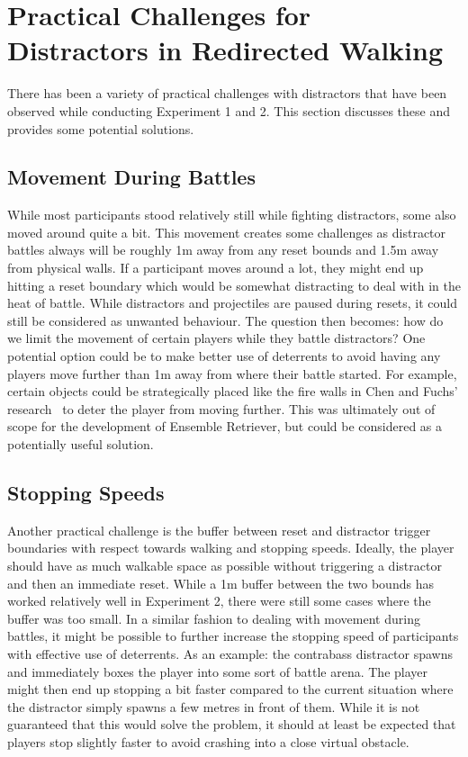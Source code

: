 \section{Practical Challenges for Distractors in Redirected Walking}
There has been a variety of practical challenges with distractors that have been observed while conducting Experiment 1 and 2. This section discusses these and provides some potential solutions. 

\subsection{Movement During Battles}
While most participants stood relatively still while fighting distractors, some also moved around quite a bit. This movement creates some challenges as distractor battles always will be roughly 1m away from any reset bounds and 1.5m away from physical walls. If a participant moves around a lot, they might end up hitting a reset boundary which would be somewhat distracting to deal with in the heat of battle. While distractors and projectiles are paused during resets, it could still be considered as unwanted behaviour. The question then becomes: how do we limit the movement of certain players while they battle distractors? One potential option could be to make better use of deterrents to avoid having any players move further than 1m away from where their battle started. For example, certain objects could be strategically placed like the fire walls in Chen and Fuchs' research~\cite{chen2017towards, chen2017supporting} to deter the player from moving further. This was ultimately out of scope for the development of Ensemble Retriever, but could be considered as a potentially useful solution.  

\subsection{Stopping Speeds}
Another practical challenge is the buffer between reset and distractor trigger boundaries with respect towards walking and stopping speeds. Ideally, the player should have as much walkable space as possible without triggering a distractor and then an immediate reset. While a 1m buffer between the two bounds has worked relatively well in Experiment 2, there were still some cases where the buffer was too small. In a similar fashion to dealing with movement during battles, it might be possible to further increase the stopping speed of participants with effective use of deterrents. As an example: the contrabass distractor spawns and immediately boxes the player into some sort of battle arena. The player might then end up stopping a bit faster compared to the current situation where the distractor simply spawns a few metres in front of them. While it is not guaranteed that this would solve the problem, it should at least be expected that players stop slightly faster to avoid crashing into a close virtual obstacle.

